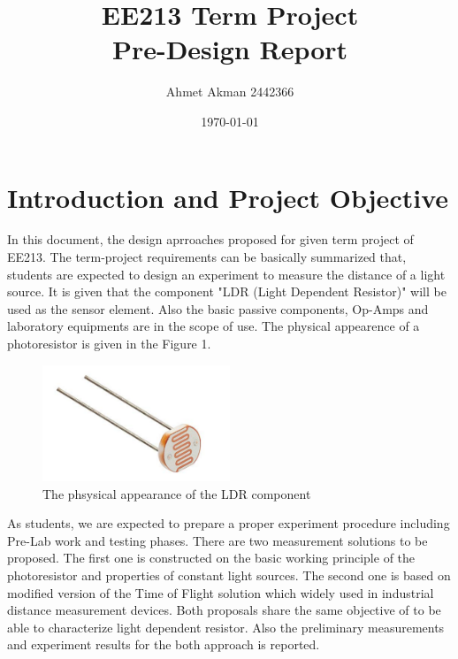 \documentclass[letterpaper,12pt]{article}
\begin{document}
\title{EE213 Term Project \protect\\Pre-Design Report}
\author{Ahmet Akman 2442366}
\date{\today}
\maketitle
\newpage

\tableofcontents
\newpage


\section{Introduction and Project Objective}
In this document, the design aprroaches proposed for given term project of EE213. The term-project requirements can be basically summarized that, students are expected to design an experiment to measure the distance of a light source. It is given that the component "LDR (Light Dependent Resistor)" will be used as the sensor element. Also the basic passive components, Op-Amps and laboratory equipments are in the scope of use. The physical appearence of a photoresistor is given in the Figure 1. 
\begin{figure}[H]
	\centering
   \includegraphics[width=0.5\textwidth]{LDR_photo.png}
   \caption{The phsysical appearance of the LDR component}
\end{figure} 
As students, we are expected to prepare a proper experiment procedure including Pre-Lab work and testing phases. 
There are two measurement solutions to be proposed. The first one is constructed on the basic working principle of the photoresistor and properties of constant light sources. The second one is based on modified version of the Time of Flight solution which widely used in industrial distance measurement devices. Both proposals share the same objective of to be able to characterize light dependent resistor. Also the preliminary measurements and experiment results for the both approach is reported.
\end{document}
